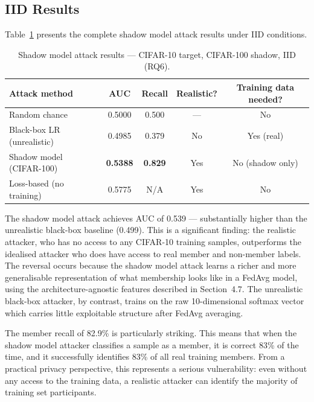 \documentclass[12pt, a4paper]{report}
\begin{document}
\subsection{IID Results}

Table~\ref{tab:shadow_iid} presents the complete shadow model attack results
under IID conditions.

\begin{table}[H]
  \centering
  \caption{Shadow model attack results --- CIFAR-10 target, CIFAR-100 shadow, IID (RQ6).}
  \label{tab:shadow_iid}
  \begin{tabular}{lcccc}
    \toprule
    \textbf{Attack method} & \textbf{AUC} & \textbf{Recall} & \textbf{Realistic?} & \textbf{Training data needed?} \\
    \midrule
    Random chance                & 0.5000 & 0.500 & --- & No \\
    Black-box LR (unrealistic)   & 0.4985 & 0.379 & No  & Yes (real) \\
    Shadow model (CIFAR-100)     & \textbf{0.5388} & \textbf{0.829} & Yes & No (shadow only) \\
    Loss-based (no training)     & 0.5775 & N/A   & Yes & No \\
    \bottomrule
  \end{tabular}
\end{table}

The shadow model attack achieves AUC of 0.539 --- substantially higher than the
unrealistic black-box baseline (0.499). This is a significant finding: the
realistic attacker, who has no access to any CIFAR-10 training samples,
outperforms the idealised attacker who does have access to real member and
non-member labels. The reversal occurs because the shadow model attack learns
a richer and more generalisable representation of what membership looks like in
a FedAvg model, using the architecture-agnostic features described in Section~4.7.
The unrealistic black-box attacker, by contrast, trains on the raw 10-dimensional
softmax vector which carries little exploitable structure after FedAvg averaging.

The member recall of 82.9\% is particularly striking. This means that when the
shadow model attacker classifies a sample as a member, it is correct 83\% of the
time, and it successfully identifies 83\% of all real training members. From a
practical privacy perspective, this represents a serious vulnerability: even
without any access to the training data, a realistic attacker can identify the
majority of training set participants.
\end{document}
